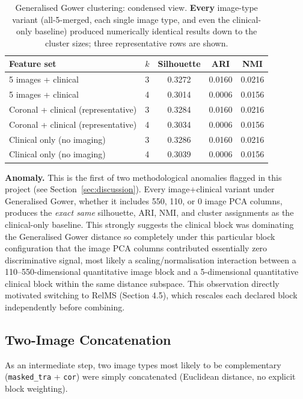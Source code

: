 \documentclass[11pt, a4paper]{article}
\begin{document}
\begin{table}[H]
\centering
\caption{Generalised Gower clustering: condensed view. \textbf{Every} image-type variant
(all-5-merged, each single image type, and even the clinical-only baseline) produced numerically
identical results down to the cluster sizes; three representative rows are shown.}
\begin{tabular}{lcccc}
\toprule
\textbf{Feature set} & $k$ & \textbf{Silhouette} & \textbf{ARI} & \textbf{NMI} \\
\midrule
5 images + clinical & 3 & 0.3272 & 0.0160 & 0.0216 \\
5 images + clinical & 4 & 0.3014 & 0.0006 & 0.0156 \\
Coronal + clinical (representative) & 3 & 0.3284 & 0.0160 & 0.0216 \\
Coronal + clinical (representative) & 4 & 0.3034 & 0.0006 & 0.0156 \\
Clinical only (no imaging) & 3 & 0.3286 & 0.0160 & 0.0216 \\
Clinical only (no imaging) & 4 & 0.3039 & 0.0006 & 0.0156 \\
\bottomrule
\end{tabular}
\end{table}

\noindent \textbf{Anomaly.} This is the first of two methodological anomalies flagged in this
project (see Section~\ref{sec:discussion}). Every image+clinical variant under Generalised Gower,
whether it includes 550, 110, or 0 image PCA columns, produces the \emph{exact same} silhouette,
ARI, NMI, and cluster assignments as the clinical-only baseline. This strongly suggests the clinical
block was dominating the Generalised Gower distance so completely under this particular block
configuration that the image PCA columns contributed essentially zero discriminative signal, most
likely a scaling/normalisation interaction between a 110--550-dimensional quantitative image block
and a 5-dimensional quantitative clinical block within the same distance subspace. This observation
directly motivated switching to RelMS (Section 4.5), which rescales each declared block
independently before combining.

\subsection{Two-Image Concatenation}

As an intermediate step, two image types most likely to be complementary (\texttt{masked\_tra} +
\texttt{cor}) were simply concatenated (Euclidean distance, no explicit block weighting).
\end{document}
